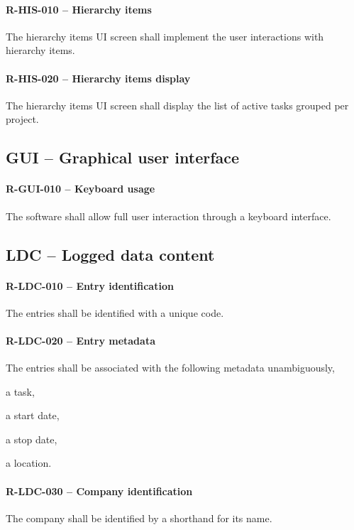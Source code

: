 \paragraph{R-HIS-010 -- Hierarchy items}
The hierarchy items UI screen shall implement the user interactions with
hierarchy items.

\paragraph{R-HIS-020 -- Hierarchy items display}
The hierarchy items UI screen shall display the list of active tasks
grouped per project.

\subsection{GUI -- Graphical user interface}
\paragraph{R-GUI-010 -- Keyboard usage}
The software shall allow full user interaction through a keyboard interface.

\subsection{LDC -- Logged data content}
\paragraph{R-LDC-010 -- Entry identification}
The entries shall be identified with a unique code.

\paragraph{R-LDC-020 -- Entry metadata}
The entries shall be associated with the following metadata unambiguously,
\begin{compactitem}
\item a task,
\item a start date,
\item a stop date,
\item a location.
\end{compactitem}

\paragraph{R-LDC-030 -- Company identification}
The company shall be identified by a shorthand for its name.

